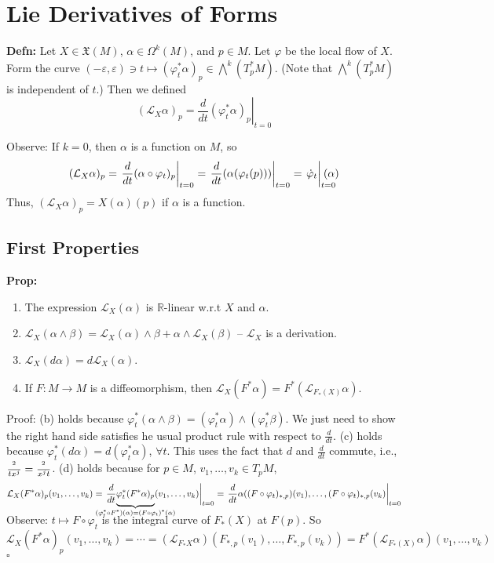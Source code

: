 \documentclass[10pt,letterpaper]{article}
\newcommand{\n}{\hfill\break}
\newcommand{\nn}{\vspace{0.5\baselineskip}\n}
\newcommand{\up}{\vspace{-\baselineskip}}
\newcommand{\hangblock}[2]{\par\noindent\settowidth{\hangindent}{\textbf{#1: }}\textbf{#1: }\nolinebreak#2}
\newcommand{\defn}[1]{\hangblock{Defn}{#1}}
\newcommand{\prop}[1]{\hangblock{Prop}{#1}}
\newcommand{\proven}{\;$\square$\n}
\newcommand{\reals}{\mathbb{R}}
\newcommand{\R}{\reals}
\let\d\relax
\newcommand{\d}{\partial}
\newcommand{\of}{\circ}
\newcommand{\restr}[2]{\left.#1\right|_{#2}}
\newcommand{\paren}[1]{\left(#1\right)}
\begin{document}
\section*{Lie Derivatives of Forms}

\defn{
	Let $X\in\mathfrak{X}(M)$, $\alpha\in\Omega^{k}(M)$, and $p\in{}M$. Let $\varphi$ be the local flow of $X$. Form the curve $(-\varepsilon,\varepsilon)\ni{}t\mapsto(\varphi_{t}^{*}\alpha)_{p}\in\bigwedge^{k}(T_{p}^{*}M)$. (Note that $\bigwedge^{k}(T_{p}^{*}M)$ is independent of $t$.) Then we defined
	\[
		(\mathcal{L}_{X}\alpha)_{p}=\restr{\frac{d}{dt}(\varphi_{t}^{*}\alpha)_{p}}{t=0}
	\]
}

\par\noindent
Observe: If $k=0$, then $\alpha$ is a function on $M$, so
\[
	(\mathcal{L}_{X}\alpha)_{p}=\restr{\frac{d}{dt}(\alpha\of\varphi_{t})_{p}}{t=0}=\restr{\frac{d}{dt}(\alpha(\varphi_{t}(p)))}{t=0}=\restr{\dot\varphi_{t}\vphantom{\frac{d}{dt}}}{\mathrlap{t=0}}(\alpha)
\]
Thus, $(\mathcal{L}_{X}\alpha)_{p}=X(\alpha)(p)$ if $\alpha$ is a function.\n

\subsection*{First Properties}

\prop{
	\begin{enumerate}[leftmargin=4\parindent, topsep=0pt, itemsep=0pt, label=\alph*)]
		\item The expression $\mathcal{L}_{X}(\alpha)$ is $\R$-linear w.r.t $X$ and $\alpha$.
		\item $\mathcal{L}_{X}(\alpha\wedge\beta)=\mathcal{L}_{X}(\alpha)\wedge\beta+\alpha\wedge\mathcal{L}_{X}(\beta)$ -- $\mathcal{L}_{X}$ is a derivation.
		\item $\mathcal{L}_{X}(d\alpha)=d\mathcal{L}_{X}(\alpha)$.
		\item If $F:M\to{}M$ is a diffeomorphism, then $\mathcal{L}_{X}(F^{*}\alpha)=F^{*}\paren{\mathcal{L}_{F_{*}(X)}\alpha}$.
	\end{enumerate}\up\nn
	Proof: (b) holds because $\varphi_{t}^{*}(\alpha\wedge\beta)=(\varphi_{t}^{*}\alpha)\wedge(\varphi_{t}^{*}\beta)$. We just need to show the right hand side satisfies he usual product rule with respect to $\frac{d}{dt}$.\n
	(c) holds because $\varphi_{t}^{*}(d\alpha)=d(\varphi_{t}^{*}\alpha)$, $\forall{}t$. This uses the fact that $d$ and $\frac{d}{dt}$ commute, i.e., $\frac{\d^{2}}{\d{}t\d{}x^{j}}=\frac{\d^{2}}{\d{}x^{j}\d{}t}$.\n
	(d) holds because for $p\in{}M$, $v_{1},\ldots,v_{k}\in{}T_{p}M$,
	\[
		\mathcal{L}_{X}(F^{*}\alpha)_{p}(v_{1},\ldots,v_{k})=\restr{\frac{d}{dt}\smash{\underbrace{\varphi_{t}^{*}(F^{*}\alpha)_{p}\vphantom{\frac{d}{dt}}}_{\mathclap{(\varphi_{t}^{*}\of{}F^{*})(\alpha)=(F\of\varphi_{t})^{*}(\alpha)}}}(v_{1},\ldots,v_{k})}{t=0}=\restr{\frac{d}{dt}\alpha((F\of\varphi_{t})_{*,p})(v_{1}),\ldots,(F\of\varphi_{t})_{*,p}(v_{k})}{t=0}
	\]
	Observe: $t\mapsto{}F\of\varphi_{t}$ is the integral curve of $F_{*}(X)$ at $F(p)$. So
	\[
		\mathcal{L}_{X}(F^{*}\alpha)_{p}(v_{1},\ldots,v_{k})=\cdots=(\mathcal{L}_{F_{*}X}\alpha)(F_{*,p}(v_{1}),\ldots,F_{*,p}(v_{k}))=F^{*}(\mathcal{L}_{F_{*}(X)}\alpha)(v_{1},\ldots,v_{k})
	\]
	\proven
}
\end{document}
